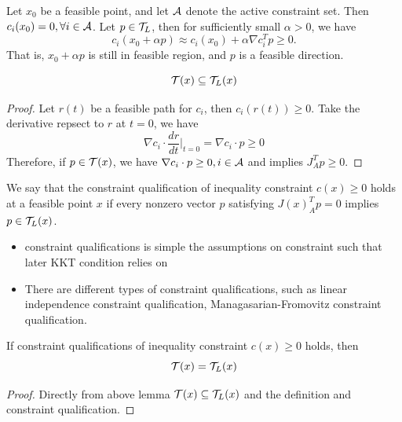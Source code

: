 \begin{refsection}
\begin{remark}
Let $x_0$ be a feasible point, and let $\mathcal{A}$ denote the active constraint set. Then $c_i(x_0) = 0,\forall i\in \mathcal{A}$. Let $p \in \mathcal{T}_{L}$, then for sufficiently small $\alpha > 0$, we have
$$c_i(x_0 + \alpha p) \approx c_i(x_0) + \alpha\nabla c_i^T p \geq 0.$$
That is, $x_0 + \alpha p$ is still in feasible region, and $p$ is a feasible direction.
\end{remark}



\begin{lemma}
$$\mathcal{T}(x) \subseteq \mathcal{T}_L(x)$$
\end{lemma}
\begin{proof}
Let $r(t)$ be a feasible path for $c_i$, then $c_i(r(t))\geq 0$. Take the derivative repsect to $r$ at $t=0$, we have
$$\nabla c_i \cdot \frac{dr}{dt}|_{t=0} = \nabla c_i \cdot p \geq 0$$
Therefore, if $p\in\mathcal{T}(x)$, we have $\nabla c_i \cdot p \geq 0,i\in \mathcal{A}$
and implies $J^T_A p \geq 0$.
\end{proof}



\begin{definition}
We say that the constraint qualification of inequality constraint $c(x) \geq 0$ holds at a feasible point $x$ if every nonzero vector $p$ satisfying $J(x)^T_Ap = 0$ implies $p \in \mathcal{T}_L(x)$.
\end{definition}

\begin{remark}\hfill
\begin{itemize}
    \item constraint qualifications is simple the assumptions on constraint such that later KKT condition relies on
    \item There are different types of constraint qualifications, such as linear independence constraint qualification, Managasarian-Fromovitz constraint qualification.
\end{itemize}
\end{remark}



\begin{lemma}
If constraint qualifications of inequality constraint $c(x) \geq 0$ holds, then
$$\mathcal{T}(x) = \mathcal{T}_L(x)$$
\end{lemma}
\begin{proof}
Directly from above lemma $\mathcal{T}(x) \subseteq \mathcal{T}_L(x)$ and the definition and constraint qualification.
\end{proof}


\end{refsection}
